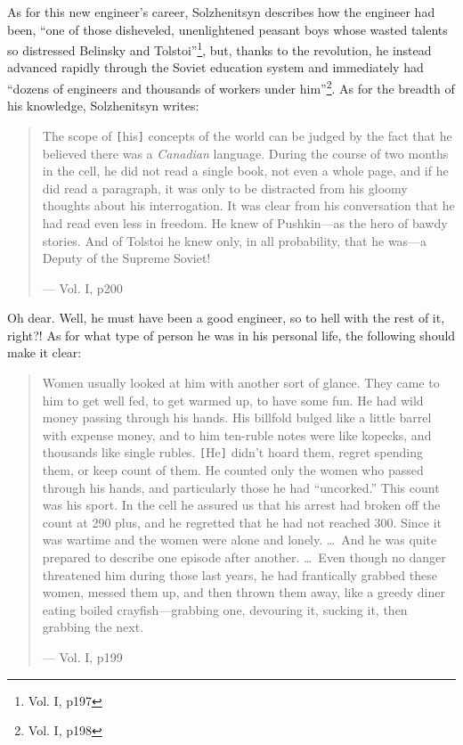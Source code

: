 \documentclass{article}
\begin{document}
As for this new engineer's career, Solzhenitsyn describes how the engineer had been, ``one of those disheveled, unenlightened peasant boys whose wasted talents so distressed Belinsky and Tolstoi''\footnote{Vol. I, p197}, but, thanks to the revolution, he instead advanced rapidly through the Soviet education system and immediately had ``dozens of engineers and thousands of workers under him''\footnote{Vol. I, p198}.  As for the breadth of his knowledge, Solzhenitsyn writes:

\begin{quote}
The scope of \verb|[|his\verb|]| concepts of the world can be judged by the fact that he believed there was a \emph{Canadian} language.  During the course of two months in the cell, he did not read a single book, not even a whole page, and if he did read a paragraph, it was only to be distracted from his gloomy thoughts about his interrogation.  It was clear from his conversation that he had read even less in freedom.  He knew of Pushkin---as the hero of bawdy stories.  And of Tolstoi he knew only, in all probability, that he was---a Deputy of the Supreme Soviet!

--- Vol. I, p200
\end{quote}

Oh dear.  Well, he must have been a good engineer, so to hell with the rest of it, right?!  As for what type of person he was in his personal life, the following should make it clear:

\begin{quote}
Women usually looked at him with another sort of glance.  They came to him to get well fed, to get warmed up, to have some fun.  He had wild money passing through his hands.  His billfold bulged like a little barrel with expense money, and to him ten-ruble notes were like kopecks, and thousands like single rubles.  \verb|[|He\verb|]| didn't hoard them, regret spending them, or keep count of them.  He counted only the women who passed through his hands, and particularly those he had ``uncorked.''  This count was his sport.  In the cell he assured us that his arrest had broken off the count at 290 plus, and he regretted that he had not reached 300.  Since it was wartime and the women were alone and lonely. \ldots~And he was quite prepared to describe one episode after another.  \ldots~Even though no danger threatened him during those last years, he had frantically grabbed these women, messed them up, and then thrown them away, like a greedy diner eating boiled crayfish---grabbing one, devouring it, sucking it, then grabbing the next.

--- Vol. I, p199
\end{quote}
\end{document}
